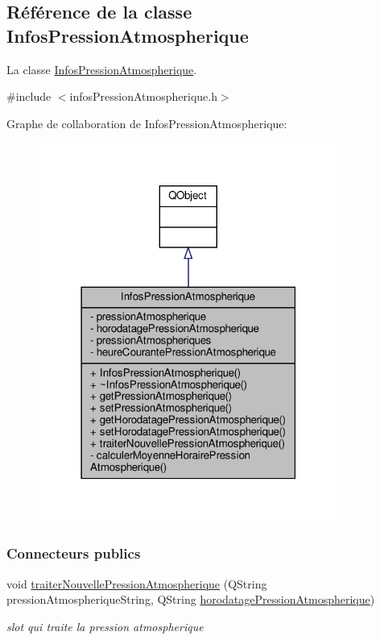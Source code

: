 \hypertarget{class_infos_pression_atmospherique}{}\subsection{Référence de la classe Infos\+Pression\+Atmospherique}
\label{class_infos_pression_atmospherique}


La classe \hyperlink{class_infos_pression_atmospherique}{Infos\+Pression\+Atmospherique}.  




{\ttfamily \#include $<$infos\+Pression\+Atmospherique.\+h$>$}



Graphe de collaboration de Infos\+Pression\+Atmospherique\+:\nopagebreak
\begin{figure}[H]
\begin{center}
\leavevmode
\includegraphics[width=279pt]{class_infos_pression_atmospherique__coll__graph}
\end{center}
\end{figure}
\subsubsection*{Connecteurs publics}
\begin{DoxyCompactItemize}
\item 
void \hyperlink{class_infos_pression_atmospherique_ab280f47f2a1376222a45fde8638489d2}{traiter\+Nouvelle\+Pression\+Atmospherique} (Q\+String pression\+Atmospherique\+String, Q\+String \hyperlink{class_infos_pression_atmospherique_aba207458a51a9290e4f2e0795983a44e}{horodatage\+Pression\+Atmospherique})
\begin{DoxyCompactList}\small\item\em slot qui traite la pression atmospherique \end{DoxyCompactList}\end{DoxyCompactItemize}
